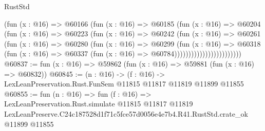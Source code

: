 \begin{lexlean}{RustStd}
\begin{coremodule}
                              (fun (x : @16) =>
                              @60166
                                (fun (x : @16) =>
                                @60185
                                  (fun (x : @16) =>
                                  @60204
                                    (fun (x : @16) =>
                                    @60223
                                      (fun (x : @16) =>
                                      @60242
                                        (fun (x : @16) =>
                                        @60261
                                          (fun (x : @16) =>
                                          @60280
                                            (fun (x : @16) =>
                                            @60299
                                              (fun (x : @16) =>
                                              @60318
                                                (fun (x : @16) =>
                                                @60337
                                                  (fun (x : @16) => @60784))))))))))))))))))))))))
@60837 := fun (x : @16) => @59862 (fun (x : @16) => @59881 (fun (x : @16) => @60832))
@60845 := (n : @16) ->
  (f : @16) -> LexLeanPreservation.Rust.FunSem @11815 @11817 @11819 @11899 @11855
@60855 := fun (n : @16) =>
  fun (f : @16) =>
  LexLeanPreservation.Rust.simulate
    @11815
    @11817
    @11819
    LexLeanPreserve.C24c187528d1f71c5fce57d0056e4e7b4.R41.RustStd.crate_ok
    @11899
    @11855
\end{coremodule}
\end{lexlean}
